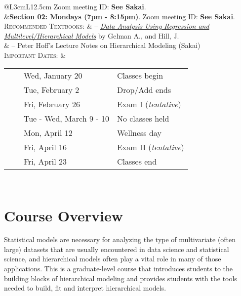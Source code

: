 \documentclass[11pt, a4paper]{article}
\newcommand{\tabitem}{~~\llap{\textbullet}~~}
\begin{document}
\begin{center}
\begin{minipage}[t]{.95\textwidth}
\begin{tabular}{@{}L{3cm}L{12.5cm}}
			\newline Zoom meeting ID: \textbf{See Sakai}.  \\
			&\textbf{Section 02: Mondays (7pm - 8:15pm)}. 
			\newline Zoom meeting ID: \textbf{See Sakai}.  \\
			\textsc{Recommended Textbooks:} & -- \href{https://www.amazon.com/gp/product/052168689X/ref=as_li_qf_sp_asin_il_tl?ie=UTF8&camp=1789&creative=9325&creativeASIN=052168689X&linkCode=as2&tag=andrsblog0f-20&linkId=PX5B5V6ZPCT2UIYV}{\textit{Data Analysis Using Regression and Multilevel/Hierarchical Models}} by Gelman A., and Hill, J.  \\
			& -- Peter Hoff's Lecture Notes on Hierarchical Modeling (Sakai) \\
			\textsc{Important Dates:} & \begin{minipage}[t]{.95\textwidth}
				\begin{tabular}{@{}ll}
					\tabitem Wed, January 20 & Classes begin \\
					\tabitem Tue, February 2 & Drop/Add ends \\
					\tabitem Fri, February 26 & Exam I (\textit{tentative})\\
					\tabitem Tue - Wed, March 9 - 10	& No classes held \\
					\tabitem Mon, April 12	& Wellness day \\
					\tabitem Fri, April 16 & Exam II (\textit{tentative})\\
					\tabitem Fri, April 23 & Classes end \\
				\end{tabular}
			\end{minipage} \\
			\bottomrule[0.065cm]
		\end{tabular}
	\end{minipage}
\end{center}



\vspace{.5cm}
\setlength{\unitlength}{1in}
\renewcommand{\arraystretch}{1.5}



\section{Course Overview}
Statistical models are necessary for analyzing the type of multivariate (often large) datasets that are usually encountered in data science and statistical science, and hierarchical models often play a vital role in many of those applications. This is a graduate-level course that introduces students to the building blocks of hierarchical modeling and provides students with the tools needed to build, fit and interpret hierarchical models.
\end{document}
